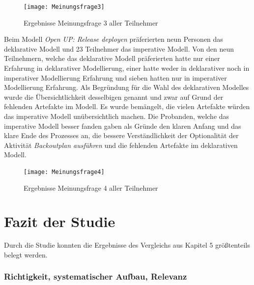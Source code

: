 \begin{figure}[htp]
\begin{center}
  \texttt{[image: Meinungsfrage3]} %
  \caption{Ergebnisse Meinungsfrage 3 aller Teilnehmer}
  \label{fig:Meinungsfrage3}
\end{center}
\end{figure}

Beim Modell \textit{Open UP: Release deployen} präferierten neun Personen das deklarative Modell und 23 Teilnehmer das imperative Modell. Von den neun Teilnehmern, welche das deklarative Modell präferierten hatte nur einer Erfahrung in deklarativer Modellierung, einer hatte weder in deklarativer noch in imperativer Modellierung Erfahrung und sieben hatten nur in imperativer Modellierung Erfahrung. \newline
Als Begründung für die Wahl des deklarativen Modelles wurde die Übersichtlichkeit desselbigen genannt und zwar auf Grund der fehlenden Artefakte im Modell. Es wurde bemängelt, die vielen Artefakte würden das imperative Modell unübersichtlich machen.\newline
Die Probanden, welche das imperative Modell besser fanden gaben als Gründe den klaren Anfang und das klare Ende des Prozesses an, die bessere Verständlichkeit der Optionalität der Aktivität \textit{Backoutplan ausführen} und die fehlenden Artefakte im deklarativen Modell. \newline



\begin{figure}[htp]
\begin{center}
  \texttt{[image: Meinungsfrage4]} %
  \caption{Ergebnisse Meinungsfrage 4 aller Teilnehmer}
  \label{fig:Meinungsfrage4}
\end{center}
\end{figure}

\clearpage

\section{Fazit der Studie}

Durch die Studie konnten die Ergebnisse des Vergleichs aus Kapitel 5 größtenteils belegt werden.\newline

\subsubsection{Richtigkeit, systematischer Aufbau, Relevanz}


